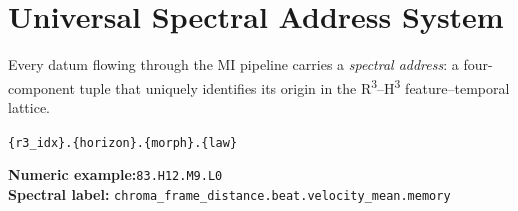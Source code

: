 
\section{Universal Spectral Address System}
\label{sec:spectral-address}

Every datum flowing through the MI pipeline carries a \emph{spectral address}:
a four-component tuple that uniquely identifies its origin in the
R\textsuperscript{3}--H\textsuperscript{3} feature--temporal lattice.

\medskip

\begin{center}
\texttt{\{r3\_idx\}.\{horizon\}.\{morph\}.\{law\}}
\end{center}

\medskip

\noindent
\textbf{Numeric example:}\quad \texttt{83.H12.M9.L0}\\[2pt]
\textbf{Spectral label:}\quad
\texttt{chroma\_frame\_distance.beat.velocity\_mean.memory}

